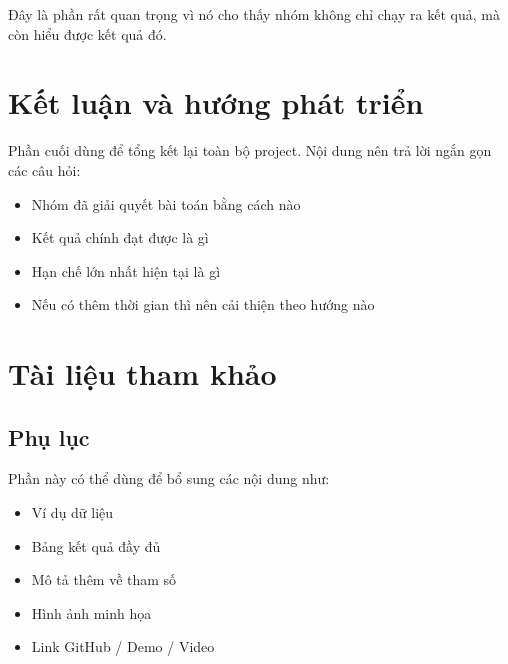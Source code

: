 \documentclass[12pt]{ai_conquer2026}
\begin{document}
Đây là phần rất quan trọng vì nó cho thấy nhóm không chỉ chạy ra kết quả, mà còn hiểu được kết quả đó.

\section{Kết luận và hướng phát triển}

Phần cuối dùng để tổng kết lại toàn bộ project. Nội dung nên trả lời ngắn gọn các câu hỏi:
\begin{itemize}
    \item Nhóm đã giải quyết bài toán bằng cách nào
    \item Kết quả chính đạt được là gì
    \item Hạn chế lớn nhất hiện tại là gì
    \item Nếu có thêm thời gian thì nên cải thiện theo hướng nào
\end{itemize}

\newpage
\section{Tài liệu tham khảo}
\label{section:references}
\nocite{*}
\vspace{-3.2em}
\printbibliography

\newpage
\begin{appendices}

\section{Phụ lục}

Phần này có thể dùng để bổ sung các nội dung như:
\begin{itemize}
    \item Ví dụ dữ liệu
    \item Bảng kết quả đầy đủ
    \item Mô tả thêm về tham số
    \item Hình ảnh minh họa
    \item Link GitHub / Demo / Video
\end{itemize}

\end{appendices}
\end{document}
